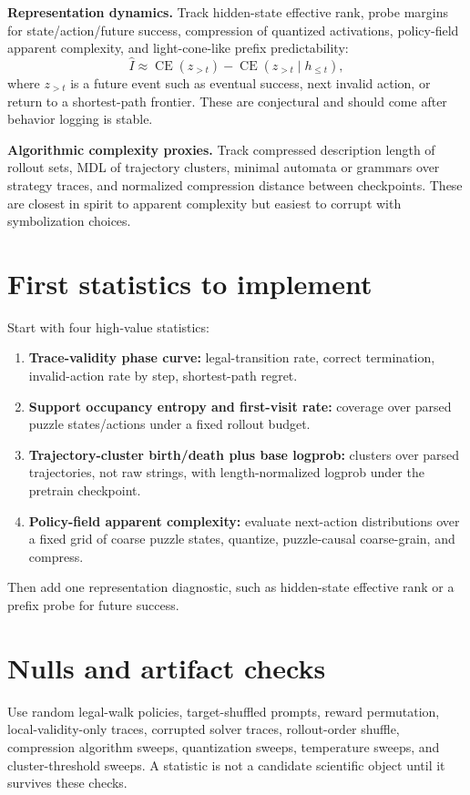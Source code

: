 \documentclass[11pt]{article}
\begin{document}
\textbf{Representation dynamics.}
Track hidden-state effective rank, probe margins for state/action/future success,
compression of quantized activations, policy-field apparent complexity, and
light-cone-like prefix predictability:
\[
\widehat I \approx \operatorname{CE}(z_{>t}) -
\operatorname{CE}(z_{>t} \mid h_{\leq t}),
\]
where $z_{>t}$ is a future event such as eventual success, next invalid action,
or return to a shortest-path frontier. These are conjectural and should come
after behavior logging is stable.

\textbf{Algorithmic complexity proxies.}
Track compressed description length of rollout sets, MDL of trajectory clusters,
minimal automata or grammars over strategy traces, and normalized compression
distance between checkpoints. These are closest in spirit to apparent complexity
but easiest to corrupt with symbolization choices.

\section*{First statistics to implement}

Start with four high-value statistics:

\begin{enumerate}
\item \textbf{Trace-validity phase curve:} legal-transition rate, correct
termination, invalid-action rate by step, shortest-path regret.
\item \textbf{Support occupancy entropy and first-visit rate:} coverage over
parsed puzzle states/actions under a fixed rollout budget.
\item \textbf{Trajectory-cluster birth/death plus base logprob:} clusters over
parsed trajectories, not raw strings, with length-normalized logprob under the
pretrain checkpoint.
\item \textbf{Policy-field apparent complexity:} evaluate next-action
distributions over a fixed grid of coarse puzzle states, quantize, puzzle-causal
coarse-grain, and compress.
\end{enumerate}

Then add one representation diagnostic, such as hidden-state effective rank or a
prefix probe for future success.

\section*{Nulls and artifact checks}

Use random legal-walk policies, target-shuffled prompts, reward permutation,
local-validity-only traces, corrupted solver traces, rollout-order shuffle,
compression algorithm sweeps, quantization sweeps, temperature sweeps, and
cluster-threshold sweeps. A statistic is not a candidate scientific object until
it survives these checks.
\end{document}
